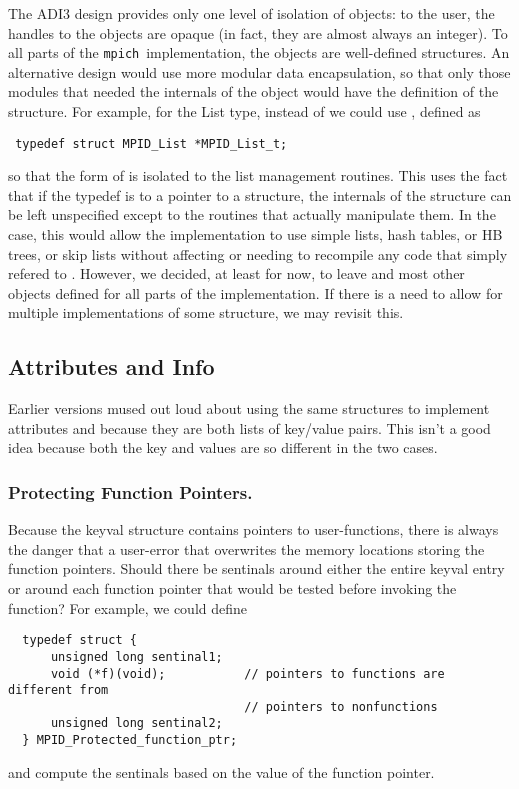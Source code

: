 \documentclass[dvipdfm]{article}
\newcommand{\mpich}{\texttt{mpich}}
\begin{document}
The ADI3 design provides only one level of isolation of objects: to
the user, the handles to the objects are opaque (in fact, they are
almost always an integer).  To all parts of the \mpich\ implementation,
the objects are well-defined structures.  An alternative design would
use more modular data encapsulation, so that only those modules that
needed the internals of the object would have the definition of the
structure.  For example, for the List type, instead of  we could use , defined as
\begin{verbatim}
 typedef struct MPID_List *MPID_List_t;
\end{verbatim}
so that the form of  is isolated to the list
management routines.
This uses the fact that if the typedef is to a pointer to a structure,
the internals of the 
structure can be left unspecified except to the routines that actually 
manipulate them.  In the  case, this would allow the
implementation 
to use simple lists, hash tables, or HB trees, or skip lists without 
affecting or needing to recompile any code that simply refered to
. 
However, we decided, at least for now, to leave  and
most other objects defined for all parts of the implementation.  If
there is a need to allow for multiple implementations of some
structure, we may revisit this.  

\subsection{Attributes and Info}
Earlier versions mused out loud about using the same structures to
implement attributes and  because they are both lists
of key/value pairs.  This isn't a good idea because both the key and
values are so different in the two cases.

\subsubsection{Protecting Function Pointers.}
  Because the keyval structure contains pointers to user-functions,
  there is always 
  the danger that a user-error that overwrites the memory locations storing 
  the function pointers.  Should there be sentinals around either the entire
  keyval entry or around each function pointer that would be tested before 
  invoking the function?  
  For example, we could define
\begin{verbatim}
  typedef struct { 
      unsigned long sentinal1;
      void (*f)(void);           // pointers to functions are different from
                                 // pointers to nonfunctions 
      unsigned long sentinal2;
  } MPID_Protected_function_ptr;
\end{verbatim}
  and compute the sentinals based on the value of the function pointer.
\end{document}
